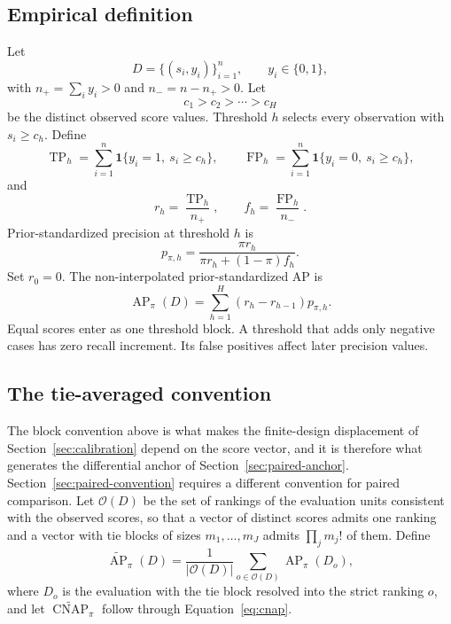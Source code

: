 \documentclass[11pt]{article}
\newcommand{\AP}{\operatorname{AP}}
\newcommand{\CNAP}{\operatorname{CNAP}}
\newcommand{\APta}{\widetilde{\AP}}
\newcommand{\CNAPta}{\widetilde{\CNAP}}
\theoremstyle{remark}
\begin{document}
\subsection{Empirical definition}

Let
\[
D=\{(s_i,y_i)\}_{i=1}^{n},
\qquad
y_i\in\{0,1\},
\]
with $n_+=\sum_i y_i>0$ and $n_-=n-n_+>0$. Let
\[
c_1>c_2>\cdots>c_H
\]
be the distinct observed score values. Threshold $h$ selects every observation with $s_i\geq c_h$. Define
\[
\operatorname{TP}_h
=
\sum_{i=1}^{n}
\mathbf{1}\{y_i=1,\ s_i\geq c_h\},
\qquad
\operatorname{FP}_h
=
\sum_{i=1}^{n}
\mathbf{1}\{y_i=0,\ s_i\geq c_h\},
\]
and
\[
r_h=\frac{\operatorname{TP}_h}{n_+},
\qquad
f_h=\frac{\operatorname{FP}_h}{n_-}.
\]
Prior-standardized precision at threshold $h$ is
\[
p_{\pi,h}
=
\frac{\pi r_h}
{\pi r_h+(1-\pi)f_h}.
\]
Set $r_0=0$. The non-interpolated prior-standardized AP is
\begin{equation}
\AP_\pi(D)
=
\sum_{h=1}^{H}
(r_h-r_{h-1})p_{\pi,h}.
\label{eq:empirical-ap}
\end{equation}
Equal scores enter as one threshold block. A threshold that adds only negative cases has zero recall increment. Its false positives affect later precision values.

\subsection{The tie-averaged convention}
\label{app:tie-convention}

The block convention above is what makes the finite-design displacement of Section~\ref{sec:calibration} depend on the score vector, and it is therefore what generates the differential anchor of Section~\ref{sec:paired-anchor}. Section~\ref{sec:paired-convention} requires a different convention for paired comparison. Let $\mathcal{O}(D)$ be the set of rankings of the evaluation units consistent with the observed scores, so that a vector of distinct scores admits one ranking and a vector with tie blocks of sizes $m_1,\ldots,m_J$ admits $\prod_j m_j!$ of them. Define
\begin{equation}
\APta_\pi(D)
=
\frac{1}{|\mathcal{O}(D)|}
\sum_{o\in\mathcal{O}(D)}
\AP_\pi(D_o),
\label{eq:tie-averaged-ap}
\end{equation}
where $D_o$ is the evaluation with the tie block resolved into the strict ranking $o$, and let $\CNAPta_\pi$ follow through Equation~\eqref{eq:cnap}.
\end{document}
